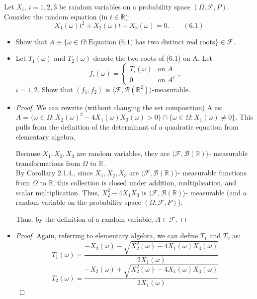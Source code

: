 \documentclass[12pt,letterpaper, onecolumn]{exam}
\newcommand{\real}{\mathbb{R}}
\newcommand{\calF}{\mathcal{F}}
\newcommand{\tribrac}[1]{\langle #1 \rangle}
\newcommand{\borel}{\mathcal{B}(\mathbb{R})}
\newcommand{\boreltwo}{\mathcal{B}(\mathbb{R}^2)}
\begin{document}
\begin{questions}
    Let $X_i$, $i = 1, 2, 3$ be random variables on a probability space $(\Omega, \calF, P)$. Consider the random equation (in $t \in \real$):
    \[X_1(\omega)t^2 + X_2(\omega)t + X_3(\omega) = 0. \quad \quad (6.1)\]
    \begin{itemize}
        \item[(a)] Show that $A \equiv \{\omega \in \Omega: \text{Equation (6.1) has two distinct real roots}\} \in \calF.$
        \item[(b)] Let $T_1(\omega)$ and $T_2(\omega)$ denote the two roots of (6.1) on A. Let 
        \[f_i(\omega) = \begin{cases}
            T_i(\omega) & \text{on } A \\
            0 & \text{on } A^c
        \end{cases},\]
        $i = 1, 2$. Show that $(f_1, f_2)$ is $\tribrac{\calF, \boreltwo}$-measurable.
    \end{itemize}
    \begin{solution}
        \begin{itemize}
            \item[(a)] 
            \begin{proof}
            We can rewrite (without changing the set composition) A as: \\ $A = \{\omega \in \Omega: X_2(\omega)^2 - 4 X_1(\omega) X_3(\omega) > 0\} \cap \{\omega \in \Omega: X_1(\omega) \neq 0\}$. This pulls from the definition of the determinant of a quadratic equation from elementary algebra.

            Because $X_1, X_2, X_3$ are random variables, they are $\tribrac{\calF, \borel}$- measurable transformations from $\Omega$ to $\real$. \\
            By Corollary 2.1.4., since $X_1, X_2, X_3$ are $\tribrac{\calF, \borel}$- measurable functions from $\Omega$ to $\real$, this collection is closed under addition, multiplication, and scalar multiplication. Thus, $X_2^2 - 4X_1 X_3$ is $\tribrac{\calF, \borel}$- measurable (and a random variable on the probability space $(\Omega, \calF, P)$). 

            Thus, by the definition of a random variable, $A \in \calF$.
            \end{proof}
            \item[(b)] 
            \begin{proof}
            Again, referring to elementary algebra, we can define $T_1$ and $T_2$ as:
            \[T_1(\omega) = \frac{-X_2(\omega) - \sqrt{X_2^2(\omega) - 4 X_1(\omega) X_3(\omega)}}{2X_1(\omega)}\] 
            \[ T_2(\omega) = \frac{-X_2(\omega) + \sqrt{X_2^2(\omega) - 4 X_1(\omega) X_3(\omega)}}{2X_1(\omega)} \]


\end{proof}
\end{itemize}
\end{solution}
\end{questions}
\end{document}
